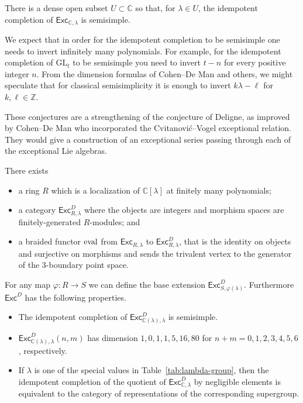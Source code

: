 \documentclass[12pt]{amsart}
\begin{document}
\begin{conjecture}
There is a dense open subset $U \subset \mathbb{C}$ so that, for
$\lambda \in U$, the idempotent
completion of $\mathsf{Exc}_{\mathbb{C},\lambda}$ is
semisimple.
\end{conjecture}

We expect that in order for the idempotent completion to be semisimple one
needs to invert infinitely many polynomials.  For example, for the idempotent
completion of $\mathrm{GL}_t$ to be semisimple you need to invert $t-n$ for
every positive integer $n$.  From the dimension formulas of Cohen--De Man and
others, we might speculate that for classical semisimplicity it is
enough to invert $k\lambda-\ell$ for $k, \ell \in \mathbb{Z}$.

These conjectures are a strengthening of the conjecture of Deligne, as
improved by Cohen--De Man who incorporated the Cvitanović--Vogel exceptional
relation. They would give a construction of an exceptional series passing
through each of the exceptional Lie algebras.

\begin{conjecture}\label{conj:Deligne}
There exists
  \begin{itemize}
  \item a ring $R$ which is a localization of $\mathbb{C}[\lambda]$ at finitely many polynomials;
  \item a category $\mathsf{Exc}^D_{R,\lambda}$ where the objects are
    integers and morphism spaces are finitely-generated $R$-modules; and
  \item a braided functor $\operatorname{eval}$ from $\mathsf{Exc}_{R,\lambda}$ to $\mathsf{Exc}^D_{R,\lambda}$, that is the identity on objects and surjective on morphisms and sends the trivalent vertex to the generator of the $3$-boundary point space.
  \end{itemize}
For any map $\varphi: R \rightarrow S$ we can define the base extension $\mathsf{Exc}^D_{S,\varphi(\lambda)}$.  Furthermore $\mathsf{Exc}^D$ has the following properties.
\begin{itemize}
\item The idempotent completion of $\mathsf{Exc}^D_{\mathbb{C}(\lambda),\lambda}$ is semisimple.
\item $\mathsf{Exc}^D_{\mathbb{C}(\lambda),\lambda}(n,m)$ has dimension $1,\allowbreak0,\allowbreak1,\allowbreak1,\allowbreak5,\allowbreak16,\allowbreak80$
for $n+m=0,1,2,3,4,5,6$, respectively.
\item If $\lambda$ is one of the special values in
  Table~\ref{tab:lambda-group}, then the idempotent completion of the
  quotient of
  $\mathsf{Exc}^D_{\mathbb{C},\lambda}$ by negligible elements is
  equivalent to the category of representations of the corresponding
  supergroup.
\end{itemize}
\end{conjecture}
\end{document}

